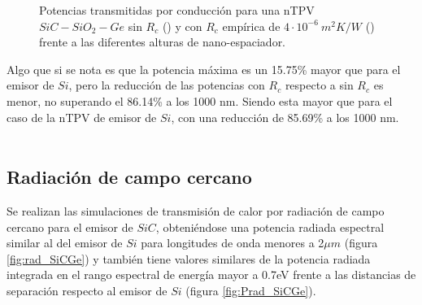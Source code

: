 \begin{figure}[H]
\begin{subfigure}[b]{0.49\textwidth}
		\caption{ }
		\label{fig:relPrc_SiCSiO2Ge}
	\end{subfigure}
	\caption{Potencias transmitidas por conducción para una nTPV $SiC-SiO_2-Ge$ sin $R_c$ () y con $R_c$ empírica de $4\cdot 10^{-6} \ m^2 K/W$ () frente a las diferentes alturas de nano-espaciador.}
	\label{fig:PrcCond_SiCSiO2Ge}
\end{figure}
Algo que si se nota es que la potencia máxima es un 15.75\% mayor que para el emisor de $Si$, pero la reducción de las potencias con $R_c$ respecto a sin $R_c$ es menor, no superando el 86.14\% a los 1000 nm. Siendo esta mayor que para el caso de la nTPV de emisor de $Si$, con una reducción de 85.69\% a los 1000 nm.\\\\
\subsection{Radiación de campo cercano}
Se realizan las simulaciones de transmisión de calor por radiación de campo cercano para el emisor de $SiC$, obteniéndose una potencia radiada espectral similar al del emisor de $Si$ para longitudes de onda menores a 2$\mu m$ (figura \ref{fig:rad_SiCGe}) y también tiene valores similares de la potencia radiada integrada en el rango espectral de energía mayor a 0.7eV frente a las distancias de separación respecto al emisor de $Si$ (figura \ref{fig:Prad_SiCGe}).
\graphicspath{ {./figuras/Resultados/radiacion} }
